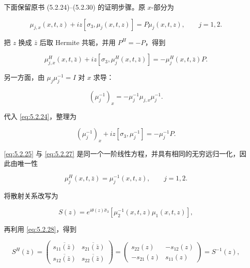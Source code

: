 \documentclass[
    lang=cn,
    scheme=chinese,
    mode=simple,
    device=normal,
    color=blue,
    math=cm,
    thmcnt=section,
    12pt
]{elegantbook}
\begin{document}
下面保留原书 (5.2.24)--(5.2.30) 的证明步骤。原 $x$-部分为

\begin{equation}
    \mu_{j,x}(x,t,z)
    +
    iz[\sigma_3,\mu_j(x,t,z)]
    =
    P\mu_j(x,t,z),
    \qquad j=1,2.
    \tag{5.2.24}
    \label{eq:5.2.24}
\end{equation}

把 $z$ 换成 $\bar z$ 后取 Hermite 共轭，并用 $P^H=-P$，得到

\begin{equation}
    \mu_{j,x}^H(x,t,\bar z)
    +
    iz[\sigma_3,\mu_j^H(x,t,\bar z)]
    =
    -\mu_j^H(x,t,\bar z)P.
    \tag{5.2.25}
    \label{eq:5.2.25}
\end{equation}

另一方面，由 $\mu_j\mu_j^{-1}=I$ 对 $x$ 求导：

\begin{equation}
    (\mu_j^{-1})_x
    =
    -\mu_j^{-1}\mu_{j,x}\mu_j^{-1}.
    \tag{5.2.26}
    \label{eq:5.2.26}
\end{equation}

代入 \eqref{eq:5.2.24}，整理为

\begin{equation}
    (\mu_j^{-1})_x
    +
    iz[\sigma_3,\mu_j^{-1}]
    =
    -\mu_j^{-1}P.
    \tag{5.2.27}
    \label{eq:5.2.27}
\end{equation}

\eqref{eq:5.2.25} 与 \eqref{eq:5.2.27} 是同一个一阶线性方程，并具有相同的无穷远归一化，因此由唯一性

\begin{equation}
    \mu_j^H(x,t,\bar z)
    =
    \mu_j^{-1}(x,t,z),
    \qquad j=1,2.
    \tag{5.2.28}
    \label{eq:5.2.28}
\end{equation}

将散射关系改写为

\begin{equation}
    S(z)
    =
    e^{i\theta(z)\widehat{\sigma}_3}
    \left[\mu_2^{-1}(x,t,z)\mu_1(x,t,z)\right],
    \tag{5.2.29}
    \label{eq:5.2.29}
\end{equation}

再利用 \eqref{eq:5.2.28}，得到

\[
    S^H(\bar z)
    =
    \begin{pmatrix}
        \overline{s_{11}(\bar z)} & \overline{s_{21}(\bar z)} \\
        \overline{s_{12}(\bar z)} & \overline{s_{22}(\bar z)}
    \end{pmatrix}
    =
    \begin{pmatrix}
        s_{22}(z)  & -s_{12}(z) \\
        -s_{21}(z) & s_{11}(z)
    \end{pmatrix}
    =
    S^{-1}(z),
\]
\end{document}
